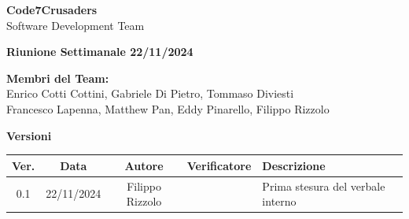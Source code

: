 \documentclass{article}
\begin{document}
\begin{titlepage}
    {\Huge \textbf{Code7Crusaders}}\\
    \vspace{0.5cm}
    {\Large Software Development Team}\\
    \vspace{2cm}
    
    {\large \textbf{Riunione Settimanale 22/11/2024}}\\ 
    \vspace{5cm}                           
    
    
    \textbf{Membri del Team:}\\
    Enrico Cotti Cottini, Gabriele Di Pietro, Tommaso Diviesti \\
    Francesco Lapenna, Matthew Pan, Eddy Pinarello, Filippo Rizzolo \\
    \vspace{0.5cm}
    
    \vspace{1cm}
\end{titlepage}



\newpage
\begin{table}[h!]
\centering
\textbf{Versioni} \\ %
\vspace{2mm} %
\begin{tabular}{|c|c|c|c|>{\raggedright\arraybackslash}p{}|}
    \hline
    \textbf{Ver.} & \textbf{Data} & \textbf{Autore} & \textbf{Verificatore} & \textbf{Descrizione} \\
    \hline
    0.1 & 22/11/2024 & Filippo Rizzolo &  & Prima stesura del verbale interno \\ 
    \hline                                  
\end{tabular}
\end{table}



\newpage
\tableofcontents



\newpage
\end{document}
